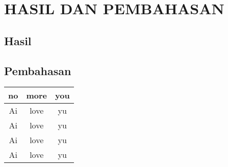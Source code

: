 \chapter{HASIL DAN PEMBAHASAN}

\section{Hasil}
\lipsum
\section{Pembahasan}
\lipsum
\lipsum

\begin{tabel}
	\begin{tabular}{|c|c|c|}
		\hline
		no & more & you\\ \hline
		Ai &  love & yu \\
		Ai &  love & yu \\
		Ai &  love & yu \\
		Ai &  love & yu \\\hline
	\end{tabular}
\end{tabel}